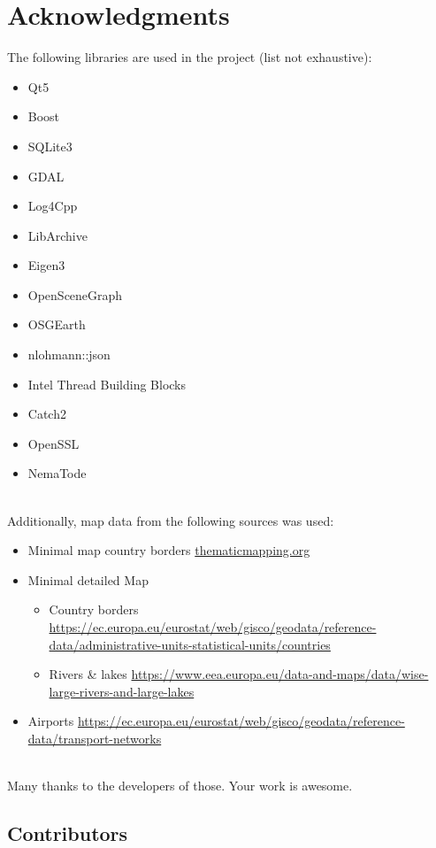  \section{Acknowledgments}

The following libraries are used in the project (list not exhaustive):

\begin{itemize}  
\item Qt5
\item Boost
\item SQLite3
\item GDAL
\item Log4Cpp
\item LibArchive
\item Eigen3
\item OpenSceneGraph
\item OSGEarth
\item nlohmann::json
\item Intel Thread Building Blocks
\item Catch2
\item OpenSSL
\item NemaTode
\end{itemize}
\ \\

Additionally, map data from the following sources was used:
\begin{itemize}  
\item Minimal map country borders \url{thematicmapping.org}
\item Minimal detailed Map
\begin{itemize} 
\item Country borders \url{https://ec.europa.eu/eurostat/web/gisco/geodata/reference-data/administrative-units-statistical-units/countries}
\item Rivers \& lakes \url{https://www.eea.europa.eu/data-and-maps/data/wise-large-rivers-and-large-lakes}
\end{itemize}
\item Airports \url{https://ec.europa.eu/eurostat/web/gisco/geodata/reference-data/transport-networks}
\end{itemize}
\ \\
Many thanks to the developers of those. Your work is awesome.

\subsection{Contributors}

